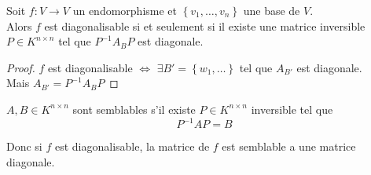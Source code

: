 \documentclass[../main.tex]{subfiles}
\begin{document}
\begin{crly}
	Soit $f:V \to V$ un endomorphisme et $ \left\{ v_1, \ldots, v_n \right\} $ une base de $V$.\\
	Alors $f$ est diagonalisable si et seulement si il existe une matrice inversible $P \in K^{n\times n}$ tel que $P^{-1}A_BP $ est diagonale.
\end{crly}
\begin{proof}
$f$ est diagonalisable $\iff$ $\exists B'= \left\{ w_1, \ldots \right\} $ tel que $A_{B'} $ est diagonale.\\
Mais $A_{B'} = P^{-1} A_B P$
\end{proof}
\begin{defn}
	$A,B \in K^{n\times n}$ sont semblables s'il existe $P \in K^{n\times n}$ inversible tel que
	\[ 
	P^{-1}A P = B
	\]
	
	
\end{defn}
Donc si $f$ est diagonalisable, la matrice de $f$ est semblable a une matrice diagonale.
\end{document}
